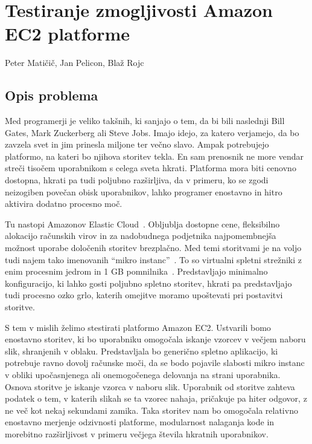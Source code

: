 \chapter[Testiranje zmogljivosti Amazon EC2 platforme (P. Matičič, J. Pelicon, B. Rojc)]{Testiranje zmogljivosti Amazon EC2 platforme}

\pagestyle{fancy}
\fancyhf{}
\fancyhead[LE,RO]{\thepage}
\fancyhead[RE,LO]{\leftmark}

\huge Peter Matičič, Jan Pelicon, Blaž Rojc
\normalsize
\bigskip

\section{Opis problema}

Med programerji je veliko takšnih, ki sanjajo o tem, da bi bili naslednji Bill Gates, Mark Zuckerberg ali Steve Jobs.
Imajo idejo, za katero verjamejo, da bo zavzela svet in jim prinesla miljone ter večno slavo.
Ampak potrebujejo platformo, na kateri bo njihova storitev tekla.
En sam prenosnik ne more vendar streči tisočem uporabnikom s celega sveta hkrati.
Platforma mora biti cenovno dostopna, hkrati pa tudi poljubno razširljiva, da v primeru, ko se zgodi neizogiben povečan obisk uporabnikov, lahko programer enostavno in hitro aktivira dodatno procesno moč.

Tu nastopi Amazonov Elastic Cloud~\cite{1_aws_amazon_ec2}.
Obljublja dostopne cene, fleksibilno alokacijo računskih virov in za nadobudnega podjetnika najpomembnejša možnost uporabe določenih storitev brezplačno.
Med temi storitvami je na voljo tudi najem tako imenovanih ``mikro instanc''~\cite{1_aws_amazon_free}. 
To so virtualni spletni strežniki z enim procesnim jedrom in 1 GB pomnilnika~\cite{1_aws_amazon_instances}.
Predstavljajo minimalno konfiguracijo, ki lahko gosti poljubno spletno storitev, hkrati pa predstavljajo tudi procesno ozko grlo, katerih omejitve moramo upoštevati pri postavitvi storitve.

S tem v mislih želimo stestirati platformo Amazon EC2.
Ustvarili bomo enostavno storitev, ki bo uporabniku omogočala iskanje vzorcev v večjem naboru slik, shranjenih v oblaku.
Predstavljala bo generično spletno aplikacijo, ki potrebuje ravno dovolj računske moči, da se bodo pojavile slabosti mikro instanc v obliki upočasnjenega ali onemogočenega delovanja na strani uporabnika.
Osnova storitve je iskanje vzorca v naboru slik.
Uporabnik od storitve zahteva podatek o tem, v katerih slikah se ta vzorec nahaja, pričakuje pa hiter odgovor, z ne več kot nekaj sekundami zamika.
Taka storitev nam bo omogočala relativno enostavno merjenje odzivnosti platforme, modularnost nalaganja kode in morebitno razširljivost v primeru večjega števila hkratnih uporabnikov.

